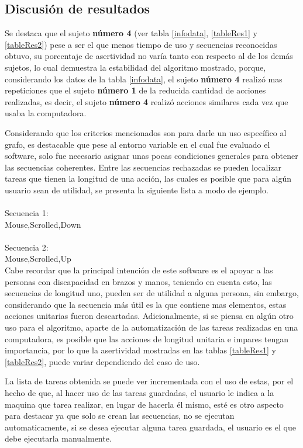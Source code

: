 \subsection{Discusi\'{o}n de resultados}


Se destaca que el sujeto \textbf{n\'umero 4} (ver tabla 
 \ref{infodata}, \ref{tableRes1} y \ref{tableRes2}) pese a ser el que menos
 tiempo de uso y secuencias reconocidas obtuvo, su porcentaje de asertividad
 no var\'ia tanto con respecto al de los dem\'as sujetos, lo cual demuestra 
 la estabilidad del algoritmo mostrado, porque, considerando los datos de la 
 tabla \ref{infodata}, el sujeto \textbf{n\'umero 4} realiz\'o mas 
 repeticiones que el sujeto \textbf{n\'umero 1} de la reducida cantidad de 
 acciones realizadas, es decir, el sujeto \textbf{n\'umero 4} realiz\'o 
 acciones similares cada vez que usaba la computadora.
 
 
Considerando que los criterios mencionados son para darle un uso espec\'ifico
 al grafo, es destacable que pese al entorno variable en el cual fue evaluado
 el software, solo fue necesario asignar unas pocas
 condiciones generales para obtener las secuencias coherentes. 
 Entre las secuencias rechazadas se pueden localizar tareas que tienen la
 longitud de una acci\'on, las cuales es posible que para alg\'un usuario 
 sean de utilidad, se presenta la siguiente lista a modo de ejemplo.
\\
\\
Secuencia 1:\\
Mouse,Scrolled,Down\\
\\
Secuencia 2:\\
Mouse,Scrolled,Up\\

Cabe recordar que la principal intenci\'on de este software es el apoyar a 
 las personas con discapacidad en brazos y manos, teniendo en cuenta esto, 
 las secuencias de longitud uno, pueden ser de utilidad a alguna persona, sin 
 embargo, considerando que la secuencia m\'as \'util es la que contiene mas 
 elementos, estas acciones unitarias fueron descartadas. Adicionalmente, si 
 se piensa en alg\'un otro uso para el algoritmo, aparte de la 
 automatizaci\'on de las tareas realizadas en una computadora, es posible que 
 las acciones de longitud unitaria e impares tengan importancia, por lo que 
 la asertividad mostradas en las tablas \ref{tableRes1} y \ref{tableRes2}, 
 puede variar dependiendo del caso de uso.

La lista de tareas obtenida se puede ver incrementada con el uso de estas, por 
 el hecho de que, al hacer uso de las tareas guardadas, el usuario le indica a 
 la maquina que tarea realizar, en lugar de hacerla \'el mismo, est\'e es otro 
 aspecto para destacar ya que solo se crean las secuencias, no se ejecutan 
 automaticamente, si se desea ejecutar alguna tarea guardada, el usuario es el 
 que debe ejecutarla manualmente.


